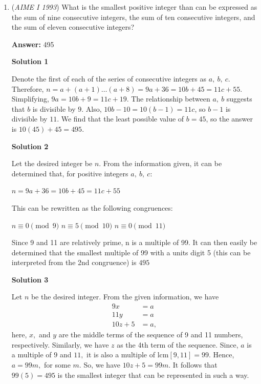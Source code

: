 \begin{enumerate}
 $^\ddagger$This formula can be found by convolving the polynomial with the series.

 - MathCactus0\_0 (don't try this on a test unless you can't think of anything else!!!)

 


	\item (\textit{AIME I 1993}) What is the smallest positive integer than can be expressed as the sum of nine consecutive integers, the sum of ten consecutive integers, and the sum of eleven consecutive integers?


 
 \textbf{Answer: }495



\textbf{Solution 1}

Denote the first of each of the series of consecutive integers as $a,\ b,\ c$. Therefore, $n = a + (a + 1) \ldots (a + 8) = 9a + 36 = 10b + 45 = 11c + 55$. Simplifying, $9a = 10b + 9 = 11c + 19$. The relationship between $a,\ b$ suggests that $b$ is divisible by $9$. Also, $10b -10 = 10(b-1) = 11c$, so $b-1$ is divisible by $11$. We find that the least possible value of $b = 45$, so the answer is $10(45) + 45 = 495$.

 



\textbf{Solution 2}

Let the desired integer be $n$. From the information given, it can be determined that, for positive integers $a, \ b, \ c$:

 $n = 9a + 36 = 10b + 45 = 11c + 55$

 This can be rewritten as the following congruences:

 $n \equiv 0 \pmod{9}$
$n \equiv 5 \pmod{10}$
$n \equiv 0 \pmod{11}$

 Since 9 and 11 are relatively prime, n is a multiple of 99. It can then easily be determined that the smallest multiple of 99 with a units digit 5 (this can be interpreted from the 2nd congruence) is $\boxed{495}$




\textbf{Solution 3}

Let $n$ be the desired integer. From the given information, we have
 \begin{align*}9x &= a \\ 11y &= a \\ 10z + 5 &= a, \end{align*}
 here, $x,$ and $y$ are the middle terms of the sequence of 9 and 11 numbers, respectively. Similarly, we have $z$ as the 4th term of the sequence. Since, $a$ is a multiple of $9$ and $11,$ it is also a multiple of $\text{lcm}[9,11]=99.$ Hence, $a=99m,$ for some $m.$ So, we have $10z + 5 = 99m.$ It follows that $99(5) = \boxed{495}$ is the smallest integer that can be represented in such a way.


\end{enumerate}
